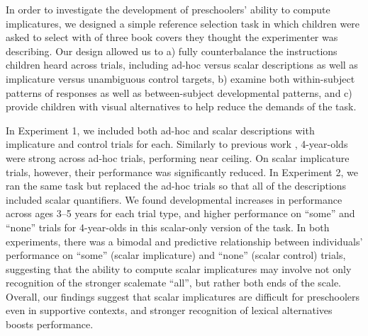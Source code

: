 \documentclass[10pt,letterpaper]{article}
\begin{document}
In order to investigate the development of preschoolers' ability to compute implicatures, we designed a simple reference selection task in which children were asked to select with of three book covers they thought the experimenter was describing. Our design allowed us to a) fully counterbalance the instructions children heard across trials, including ad-hoc versus scalar descriptions as well as implicature versus unambiguous control targets, b) examine both within-subject patterns of responses as well as between-subject developmental patterns, and c) provide children with visual alternatives to help reduce the demands of the task.

In Experiment 1, we included both ad-hoc and scalar descriptions with implicature and control trials for each. Similarly to previous work \cite[e.g.][]{stiller2014}, 4-year-olds were strong across ad-hoc trials, performing near ceiling. On scalar implicature trials, however, their performance was significantly reduced. In Experiment 2, we ran the same task but replaced the ad-hoc trials so that all of the descriptions included scalar quantifiers. We found developmental increases in performance across ages 3--5 years for each trial type, and higher performance on ``some'' and ``none'' trials for 4-year-olds in this scalar-only version of the task. In both experiments, there was a bimodal and predictive relationship between individuals' performance on ``some'' (scalar implicature) and ``none'' (scalar control) trials, suggesting that the ability to compute scalar implicatures may involve not only recognition of the stronger scalemate ``all'', but rather both ends of the scale. Overall, our findings suggest that scalar implicatures are difficult for preschoolers even in supportive contexts, and stronger recognition of lexical alternatives boosts performance. 



\end{document}
